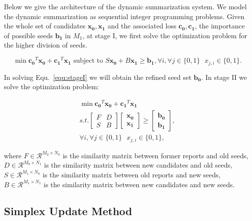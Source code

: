 \documentclass[envcountsame]{llncs}
\begin{document}
Below we give the architecture of the dynamic summarization system. We model the dynamic summarization as sequential integer programming problems.  Given the whole set of candidates $\mathbf{x_0,x_1}$ and the associated loss $\mathbf{c_0,c_1}$, the importance of possible seeds $\mathbf{b_1}$ in $M_1$, at stage I, we first solve the optimization problem for the higher division of seeds.

\vspace{-0.6cm}
\begin{equation}\label{equ:stageI}
\min \mathbf{c_0}^T \mathbf{x_0} + \mathbf{c_1}^T \mathbf{x_1} \textrm{ subject to } S \mathbf{x_0} + B\mathbf{x_1} \geq \mathbf{b_1}, \forall i, \forall j\in \{0,1\}\textrm{ } x_{j,i}\in \{0,1\}.
\end{equation}
\vspace{-0.6cm}

In solving Equ.~\ref{equ:stageI} we will obtain the refined seed set $\mathbf{b_0}$. In stage II we solve the optimization problem:

\vspace{-0.6cm}
\begin{eqnarray}
\min \mathbf{c_0}^T \mathbf{x_0}+\mathbf{c_1}^T\mathbf{x_1}\\\nonumber
s.t. \begin{bmatrix}
F & D \\
S & B
\end{bmatrix}\begin{bmatrix}
 \mathbf{x_0}\\
\mathbf{x_1}
\end{bmatrix}\geq \begin{bmatrix}
\mathbf{b_0}\\
\mathbf{b_1}
\end{bmatrix},\\\nonumber
 \forall i, \forall j\in \{0,1\}\textrm{ } x_{j,i}\in \{0,1\},
\end{eqnarray}
\vspace{-0.6cm}

where $F\in \mathcal{R}^{M_0\times N_0}$ is the similarity matrix between former reports and old seeds, $D\in \mathcal{R}^{M_0\times N_1}$ is the similarity matrix between new candidates and old seeds, $S\in \mathcal{R}^{M_1\times N_0}$ is the similarity matrix between old reports and new seeds, $B\in \mathcal{R}^{M_1 \times N_1}$ is the similarity matrix between new candidates and new seeds.

\subsection{Simplex Update Method}
\end{document}
